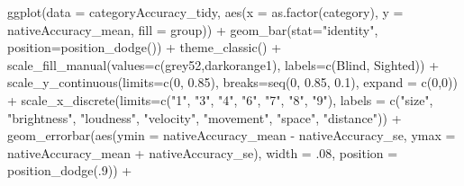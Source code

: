 \documentclass[
]{article}
\newenvironment{Shaded}{\begin{snugshade}}{\end{snugshade}}
\newcommand{\AttributeTok}[1]{\textcolor[rgb]{0.77,0.63,0.00}{#1}}
\newcommand{\DecValTok}[1]{\textcolor[rgb]{0.00,0.00,0.81}{#1}}
\newcommand{\FloatTok}[1]{\textcolor[rgb]{0.00,0.00,0.81}{#1}}
\newcommand{\FunctionTok}[1]{\textcolor[rgb]{0.00,0.00,0.00}{#1}}
\newcommand{\NormalTok}[1]{#1}
\newcommand{\SpecialCharTok}[1]{\textcolor[rgb]{0.00,0.00,0.00}{#1}}
\newcommand{\StringTok}[1]{\textcolor[rgb]{0.31,0.60,0.02}{#1}}
\begin{document}
\begin{Shaded}
\begin{Highlighting}[]
\FunctionTok{ggplot}\NormalTok{(}\AttributeTok{data =}\NormalTok{ categoryAccuracy\_tidy, }
       \FunctionTok{aes}\NormalTok{(}\AttributeTok{x =} \FunctionTok{as.factor}\NormalTok{(category), }\AttributeTok{y =}\NormalTok{ nativeAccuracy\_mean, }\AttributeTok{fill =}\NormalTok{ group)) }\SpecialCharTok{+}
  \FunctionTok{geom\_bar}\NormalTok{(}\AttributeTok{stat=}\StringTok{"identity"}\NormalTok{, }\AttributeTok{position=}\FunctionTok{position\_dodge}\NormalTok{()) }\SpecialCharTok{+}
  \FunctionTok{theme\_classic}\NormalTok{() }\SpecialCharTok{+}
  \FunctionTok{scale\_fill\_manual}\NormalTok{(}\AttributeTok{values=}\FunctionTok{c}\NormalTok{(}\StringTok{\textquotesingle{}grey52\textquotesingle{}}\NormalTok{,}\StringTok{\textquotesingle{}darkorange1\textquotesingle{}}\NormalTok{), }\AttributeTok{labels=}\FunctionTok{c}\NormalTok{(}\StringTok{\textquotesingle{}Blind\textquotesingle{}}\NormalTok{, }\StringTok{\textquotesingle{}Sighted\textquotesingle{}}\NormalTok{)) }\SpecialCharTok{+}
  \FunctionTok{scale\_y\_continuous}\NormalTok{(}\AttributeTok{limits=}\FunctionTok{c}\NormalTok{(}\DecValTok{0}\NormalTok{, }\FloatTok{0.85}\NormalTok{), }\AttributeTok{breaks=}\FunctionTok{seq}\NormalTok{(}\DecValTok{0}\NormalTok{, }\FloatTok{0.85}\NormalTok{, }\FloatTok{0.1}\NormalTok{), }\AttributeTok{expand =} \FunctionTok{c}\NormalTok{(}\DecValTok{0}\NormalTok{,}\DecValTok{0}\NormalTok{)) }\SpecialCharTok{+}
  \FunctionTok{scale\_x\_discrete}\NormalTok{(}\AttributeTok{limits=}\FunctionTok{c}\NormalTok{(}\StringTok{"1"}\NormalTok{, }\StringTok{"3"}\NormalTok{, }\StringTok{"4"}\NormalTok{, }\StringTok{"6"}\NormalTok{, }\StringTok{"7"}\NormalTok{, }\StringTok{"8"}\NormalTok{, }\StringTok{"9"}\NormalTok{),}
                   \AttributeTok{labels =} \FunctionTok{c}\NormalTok{(}\StringTok{"size"}\NormalTok{, }\StringTok{"brightness"}\NormalTok{, }\StringTok{"loudness"}\NormalTok{, }\StringTok{"velocity"}\NormalTok{, }\StringTok{"movement"}\NormalTok{, }\StringTok{"space"}\NormalTok{, }\StringTok{"distance"}\NormalTok{)) }\SpecialCharTok{+} 
  \FunctionTok{geom\_errorbar}\NormalTok{(}\FunctionTok{aes}\NormalTok{(}\AttributeTok{ymin =}\NormalTok{ nativeAccuracy\_mean }\SpecialCharTok{{-}}\NormalTok{ nativeAccuracy\_se,}
                    \AttributeTok{ymax =}\NormalTok{ nativeAccuracy\_mean }\SpecialCharTok{+}\NormalTok{ nativeAccuracy\_se),}
                \AttributeTok{width =}\NormalTok{ .}\DecValTok{08}\NormalTok{,}
                \AttributeTok{position =} \FunctionTok{position\_dodge}\NormalTok{(.}\DecValTok{9}\NormalTok{)) }\SpecialCharTok{+}

\end{Highlighting}
\end{Shaded}
\end{document}
